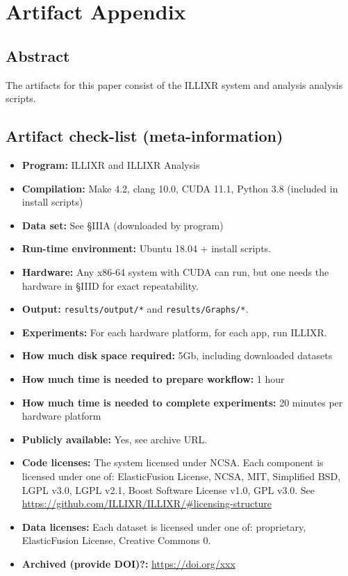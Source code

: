 \documentclass{sigplanconf}
\newcommand{\zenodo}{\footnotesize \url{https://doi.org/xxx}}
\begin{document}


\appendix
\section{Artifact Appendix}

\subsection{Abstract}

The artifacts for this paper consist of the ILLIXR system and analysis analysis scripts.

\subsection{Artifact check-list (meta-information)}

{\small
\begin{itemize}
  \item {\bf Program: } ILLIXR and ILLIXR Analysis
  \item {\bf Compilation: } Make 4.2, clang 10.0, CUDA 11.1, Python 3.8 (included in install scripts)
  \item {\bf Data set: } See \S IIIA (downloaded by program)
  \item {\bf Run-time environment: } Ubuntu 18.04 + install scripts.
  \item {\bf Hardware: } Any x86-64 system with CUDA can run, but one needs the hardware in \S IIID for exact repeatability.
  \item {\bf Output: } \texttt{results/output/*} and \texttt{results/Graphs/*}.
  \item {\bf Experiments: } For each hardware platform, for each app, run ILLIXR.
  \item {\bf How much disk space required: } 5Gb, including downloaded datasets
  \item {\bf How much time is needed to prepare workflow: } 1 hour
  \item {\bf How much time is needed to complete experiments: } 20 minutes per hardware platform
  \item {\bf Publicly available: } Yes, see archive URL.
  \item {\bf Code licenses: } The system licensed under NCSA. Each component is licensed under one of: ElasticFusion License, NCSA, MIT, Simplified BSD, LGPL v3.0, LGPL v2.1, Boost Software License v1.0, GPL v3.0. See {\footnotesize \url{https://github.com/ILLIXR/ILLIXR/\#licensing-structure}}
  \item {\bf Data licenses: } Each dataset is licensed under one of: proprietary, ElasticFusion License, Creative Commons 0.
  \item {\bf Archived (provide DOI)?: } \zenodo
\end{itemize}
}
\end{document}
